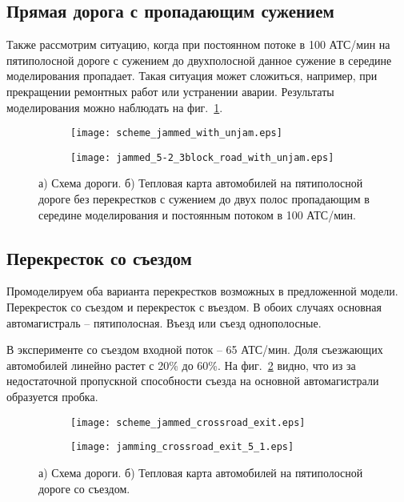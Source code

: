 \subsection{Прямая дорога с пропадающим сужением}
Также рассмотрим ситуацию, когда при постоянном потоке в 100 АТС/мин на пятиполосной дороге с сужением до двухполосной данное сужение в середине моделирования пропадает.
Такая ситуация может сложиться, например, при прекращении ремонтных работ или устранении аварии. Результаты моделирования можно наблюдать на фиг.~\ref{fig:jammed_5-2_3block_road_with_unjam}.
\begin{figure}[ht]
    \begin{subfigure}[b]{1.0\textwidth}
       \texttt{[image: scheme\_jammed\_with\_unjam.eps]}
       \caption{}
    \end{subfigure}

    \begin{subfigure}[b]{1.0\textwidth}
       \texttt{[image: jammed\_5-2\_3block\_road\_with\_unjam.eps]}
       \caption{}
    \end{subfigure}

    \caption{а) Схема дороги. б) Тепловая карта автомобилей на пятиполосной дороге без перекрестков с сужением до двух полос пропадающим в середине моделирования и постоянным потоком в 100 АТС/мин.}
    \label{fig:jammed_5-2_3block_road_with_unjam}
\end{figure}

\subsection{Перекресток со съездом}
Промоделируем оба варианта перекрестков возможных в предложенной модели.
Перекресток со съездом и перекресток с въездом. В обоих случаях основная автомагистраль -- пятиполосная. Въезд или съезд однополосные.

В эксперименте со съездом входной поток -- 65 АТС/мин. Доля съезжающих автомобилей линейно растет с 20\% до 60\%. На фиг.~\ref{fig:jamming_crossroad_exit_5_1} видно, что из за недостаточной пропускной способности съезда на основной автомагистрали образуется пробка.
\begin{figure}[ht]
    \begin{subfigure}[b]{1.0\textwidth}
       \texttt{[image: scheme\_jammed\_crossroad\_exit.eps]}
       \caption{}
    \end{subfigure}

    \begin{subfigure}[b]{1.0\textwidth}
       \texttt{[image: jamming\_crossroad\_exit\_5\_1.eps]}
       \caption{}
    \end{subfigure}

    \caption{а) Схема дороги. б) Тепловая карта автомобилей на пятиполосной дороге со съездом.}
    \label{fig:jamming_crossroad_exit_5_1}
\end{figure}

